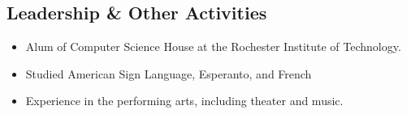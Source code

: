 \documentclass[a4paper, oneside, final]{scrartcl}
\begin{document}
\begin{center}
\section{Leadership \& Other Activities}
	\begin{itemize}
		\item Alum of Computer Science House at the Rochester Institute of Technology.
		\item Studied American Sign Language, Esperanto, and French
		\item Experience in the performing arts, including theater and music.
	\end{itemize}

\end{center}
\end{document}
